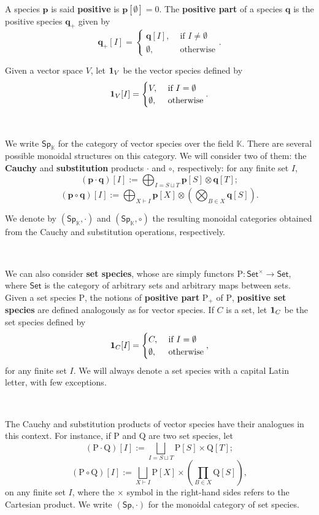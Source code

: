 \documentclass[12pt, reqno]{amsart}
\theoremstyle{definition}
\newcommand{\Fset}{\mathsf{Set^{\times}}}
\newcommand{\Set}{\mathsf{Set}}
\newcommand{\Ss}{\mathsf{Sp}} %
\newcommand{\Ssk}{\mathsf{Sp}_\Kb} %
\newcommand{\Kb}{\mathbb{K}}
\newcommand{\rP}{\mathrm{P}}
\newcommand{\rQ}{\mathrm{Q}}
\newcommand{\tp}{\mathbf{p}}
\newcommand{\tq}{\mathbf{q}}
\begin{document}
\

A species $\tp$ is said {\bf positive} is $\tp[\emptyset]=0$. The {\bf positive part} of a species $\tq$ is the positive species $\tq_+$ given by
\[\tq_+[I]=\begin{cases}
\tq[I],& \text{ if } I\neq \emptyset\\
\emptyset, & \text{ otherwise}
\end{cases}.\]

Given a vector space $V$, let ${\bf 1}_V$ be the vector species defined by
\[{\bf 1}_V[I]=\begin{cases}
V,& \text{ if } I= \emptyset\\
\emptyset, & \text{ otherwise}
\end{cases}.\]

\

We write $\Ss_{\mathbb{K}}$ for the category of vector species over the field $\mathbb{K}$. There are several possible monoidal structures on this category. 
We will consider two of them: the {\bf Cauchy} and {\bf substitution} products $\cdot$ and $\circ$, respectively: for any finite set $I$,
\[(\tp \cdot \tq)[I]:=\bigoplus_{I = S \sqcup T}\tp[S]\otimes \tq[T];\]
\[(\tp \circ \tq)[I]:=\bigoplus_{X \vdash I}\tp[X]\otimes \left(\bigotimes_{B \in X} \tq[S] \right).\]

We denote by $(\Ssk, \cdot)$ and $(\Ssk, \circ)$ the resulting monoidal categories obtained from the Cauchy and substitution operations, respectively.

\

We can also consider {\bf set species}, whose are simply functors $\rP: \Fset \to \Set$, where $\Set$ is the category of arbitrary sets and arbitrary maps between sets. Given a set species $\rP$, the notions of {\bf positive part} $\rP_+$ of $\rP$, {\bf positive set species} are defined analogously as for vector species. If $C$ is a set, let ${\bf 1}_C$ be the set species defined by
\[{\bf 1}_C[I]=\begin{cases}
C,& \text{ if } I= \emptyset\\
\emptyset, & \text{ otherwise}
\end{cases},\]
for any finite set $I$.
We will always denote a set species with a capital Latin letter, with few exceptions.

\

The Cauchy and substitution products of vector species have their analogues in this context. For instance, if $\rP$ and $\rQ$ are two set species, let
\[(\rP \cdot \rQ)[I]:=\bigsqcup_{I = S \sqcup T}\rP[S]\times \rQ[T];\]
\[(\rP \circ \rQ)[I]:=\bigsqcup_{X \vdash I}\rP[X]\times \left(\prod_{B \in X} \rQ[S] \right),\]
on any finite set $I$, where the $\times$ symbol in the right-hand sides refers to the Cartesian product.
We write $(\Ss, \cdot)$ for the monoidal category of set species.
\end{document}
